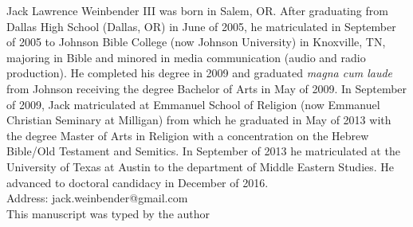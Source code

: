 
Jack Lawrence Weinbender III was born in Salem, OR. After graduating from Dallas High School (Dallas, OR) in June of 2005, he matriculated in September of 2005 to Johnson Bible College (now Johnson University) in Knoxville, TN, majoring in Bible and minored in media communication (audio and radio production). He completed his degree in 2009 and graduated \emph{magna cum laude} from Johnson receiving the degree Bachelor of Arts in May of 2009. In September of 2009, Jack matriculated at Emmanuel School of Religion (now Emmanuel Christian Seminary at Milligan) from which he graduated in May of 2013 with the degree Master of Arts in Religion with a concentration on the Hebrew Bible/Old Testament and Semitics. In September of 2013 he matriculated at the University of Texas at Austin to the department of Middle Eastern Studies. He advanced to doctoral candidacy in December of 2016.\\[36pt]


\noindent
Address: jack.weinbender@gmail.com\\[24pt]

\noindent
This manuscript was typed by the author